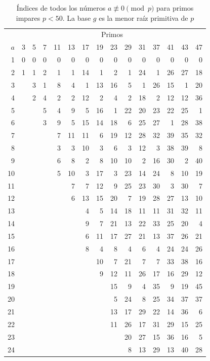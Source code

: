 \documentclass[12pt,a4paper]{book}
\begin{document}
    \begin{table}[H]
        \centering
        \scriptsize
        \setlength{\tabcolsep}{3.5pt}
        \caption{Índices de todos los números $a\not\equiv0\pmod{p}$ para primos impares $p<50$. La base $g$ es la menor raíz primitiva de $p$}
        \begin{tabular}{r|rrrrrrrrrrrrrr}
            &\multicolumn{14}{c}{Primos}\\
            $a$&3&5&7&11&13&17&19&23&29&31&37&41&43&47\\\hline
            1&0&0&0&0&0&0&0&0&0&0&0&0&0&0\\
            2&1&1&2&1&1&14&1&2&1&24&1&26&27&18\\
            3&&3&1&8&4&1&13&16&5&1&26&15&1&20\\
            4&&2&4&2&2&12&2&4&2&18&2&12&12&36\\
            5&&&5&4&9&5&16&1&22&20&23&22&25&1\\[3pt]
            6&&&3&9&5&15&14&18&6&25&27&1&28&38\\
            7&&&&7&11&11&6&19&12&28&32&39&35&32\\
            8&&&&3&3&10&3&6&3&12&3&38&39&8\\
            9&&&&6&8&2&8&10&10&2&16&30&2&40\\
            10&&&&5&10&3&17&3&23&14&24&8&10&19\\[3pt]
            11&&&&&7&7&12&9&25&23&30&3&30&7\\
            12&&&&&6&13&15&20&7&19&28&27&13&10\\
            13&&&&&&4&5&14&18&11&11&31&32&11\\
            14&&&&&&9&7&21&13&22&33&25&20&4\\
            15&&&&&&6&11&17&27&21&13&37&26&21\\[3pt]
            16&&&&&&8&4&8&4&6&4&24&24&26\\
            17&&&&&&&10&7&21&7&7&33&38&16\\
            18&&&&&&&9&12&11&26&17&16&29&12\\
            19&&&&&&&&15&9&4&35&9&19&45\\
            20&&&&&&&&5&24&8&25&34&37&37\\[3pt]
            21&&&&&&&&13&17&29&22&14&36&6\\
            22&&&&&&&&11&26&17&31&29&15&25\\
            23&&&&&&&&&20&27&15&36&16&5\\
            24&&&&&&&&&8&13&29&13&40&28\\

\end{tabular}
\end{table}
\end{document}
